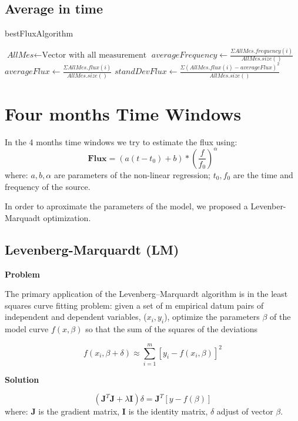 \documentclass[10pt]{article}
\begin{document}
\subsection{Average in time}
\begin{algorithm}
\caption{bestFluxAlgorithm}\label{4months}
\begin{algorithmic}[1]
\State $\textit{AllMes} \gets \text{Vector with all measurement}$
\Statex
\State $\textit{averageFrequency} \gets \frac{\Sigma AllMes.frequency(i)}{AllMes.size()}$
\Statex
\State $\textit{averageFlux} \gets \frac{\Sigma AllMes.flux(i)}{AllMes.size()}$
\Statex
\State $\textit{standDevFlux} \gets \frac{\Sigma (AllMes.flux(i) - averageFlux)^2}{AllMes.size()}$
\Statex
\State {}
\EndProcedure
\end{algorithmic}
\end{algorithm}

\section{Four months Time Windows}
In the 4 months time windows we try to estimate the flux using:
$$ \mathbf{Flux} = (a(t-t_0)+b)*\left(\frac{f}{f_0}\right)^\alpha $$
where: $a,b,\alpha$ are parameters of the non-linear regression; $t_0, f_0$ are
the time and frequency of the source.

In order to aproximate the parameters of the model, we proposed a
Levenber-Marquadt optimization. 

\subsection{Levenberg-Marquardt (LM)}
\textbf{Problem} 

The primary application of the Levenberg–Marquardt algorithm is in the least
squares curve fitting problem: given a set of m empirical datum pairs of
independent and dependent variables, ($x_i, y_i$), optimize the parameters
$\beta$ of the model curve $f(x,\beta)$ so that the sum of the squares of the
deviations

$$ f(x_i, \beta + \delta) \approx \sum\limits_{i=1}^m [y_i - f(x_i, \beta)]^2 $$

\noindent\textbf{Solution} 

$$ (\mathbf{J}^{T}\mathbf{J} + \lambda\mathbf{I})\delta = \mathbf{J}^{T}[y - f(\beta)] $$
where: $\mathbf{J}$ is the gradient matrix, $\mathbf{I}$ is the identity matrix, $\delta$ adjust of vector $\beta$.
\end{document}
